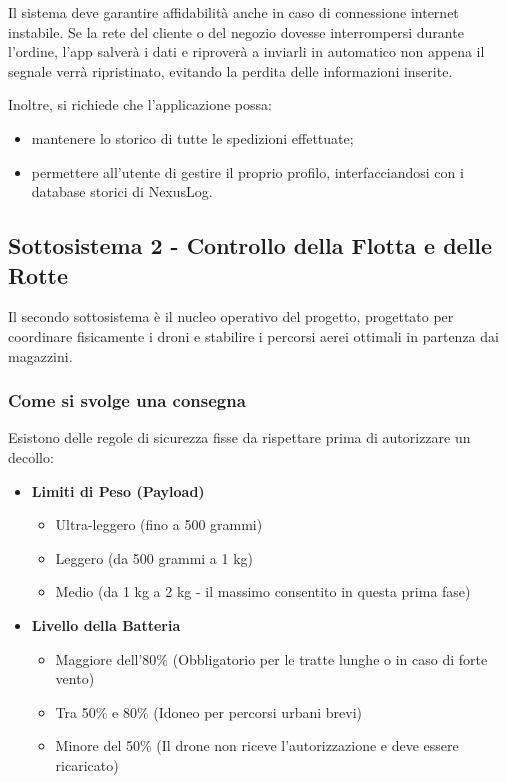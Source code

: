 \documentclass[11pt, a4paper]{article}
\begin{document}
Il sistema deve garantire affidabilità anche in caso di connessione internet instabile. Se la rete del cliente o del negozio dovesse interrompersi durante l'ordine, l'app salverà i dati e riproverà a inviarli in automatico non appena il segnale verrà ripristinato, evitando la perdita delle informazioni inserite.

Inoltre, si richiede che l'applicazione possa:
\begin{itemize}
    \item mantenere lo storico di tutte le spedizioni effettuate;
    \item permettere all'utente di gestire il proprio profilo, interfacciandosi con i database storici di NexusLog.
\end{itemize}

\subsection{Sottosistema 2 - Controllo della Flotta e delle Rotte}
Il secondo sottosistema è il nucleo operativo del progetto, progettato per coordinare fisicamente i droni e stabilire i percorsi aerei ottimali in partenza dai magazzini.

\subsubsection*{Come si svolge una consegna}
Esistono delle regole di sicurezza fisse da rispettare prima di autorizzare un decollo:
\begin{itemize}
    \item \textbf{Limiti di Peso (Payload)}
    \begin{itemize}
        \item Ultra-leggero (fino a 500 grammi)
        \item Leggero (da 500 grammi a 1 kg)
        \item Medio (da 1 kg a 2 kg - il massimo consentito in questa prima fase)
    \end{itemize}
    
    \item \textbf{Livello della Batteria}
    \begin{itemize}
        \item Maggiore dell'80\% (Obbligatorio per le tratte lunghe o in caso di forte vento)
        \item Tra 50\% e 80\% (Idoneo per percorsi urbani brevi)
        \item Minore del 50\% (Il drone non riceve l'autorizzazione e deve essere ricaricato)
    \end{itemize}
\end{itemize}
\end{document}

